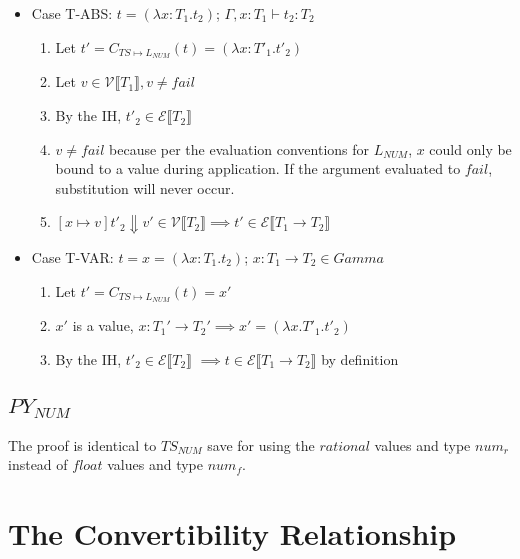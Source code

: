 \documentclass{article}
\newcommand{\denoteset}[2]{\mathcal{#1} \llbracket #2 \rrbracket}
\begin{document}
	\begin{itemize}
		\item Case T-ABS: $t = (\lambda x: T_1.t_2)$; $\Gamma, x: T_1 \vdash t_2: T_2$
		\begin{enumerate}
			\item Let $t' = C_{TS \mapsto L_{NUM}}(t) = (\lambda x: T'_1.t'_2)$
			\item Let $v \in \denoteset{V}{T_1}, v \neq fail$
			\item By the IH, $t'_2 \in \denoteset{E}{T_2}$
			\item $v \neq fail$ because per the evaluation conventions for $L_{NUM}$, $x$ could only be bound to a value during application. If the argument evaluated to $fail$, substitution will never occur.
			\item $[x \mapsto v]t'_2 \Downarrow v' \in \denoteset{V}{T_2} \implies t' \in \denoteset{E}{T_1 \rightarrow T_2}$
		\end{enumerate}
	
		\item Case T-VAR: $t = x = (\lambda x: T_1.t_2)$; $x: T_1 \rightarrow T_2 \in Gamma$
		\begin{enumerate}
			\item Let $t' = C_{TS \mapsto L_{NUM}}(t) = x'$
			\item $x'$ is a value, $x: T_1' \rightarrow T_2' \implies x' = (\lambda x. T'_1. t'_2)$
			\item By the IH, $t'_2 \in \denoteset{E}{T_2}$ $\implies t \in \denoteset{E}{T_1 \rightarrow T_2}$ by definition
		\end{enumerate}
	\end{itemize}

	\subsection{$PY_{NUM}$}
	
	The proof is identical to $TS_{NUM}$ save for using the $rational$ values and type $num_r$ instead of $float$ values and type $num_f$.

	\section{The Convertibility Relationship}
	
\end{document}
